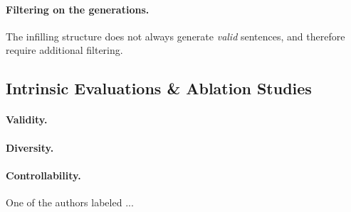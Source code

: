 \paragraph{Filtering on the generations.}
The infilling structure does not always generate \emph{valid} sentences, and therefore require additional filtering.

\subsection{Intrinsic Evaluations \& Ablation Studies}
\paragraph{Validity.}
\paragraph{Diversity.}
\paragraph{Controllability.}
One of the authors labeled ...






